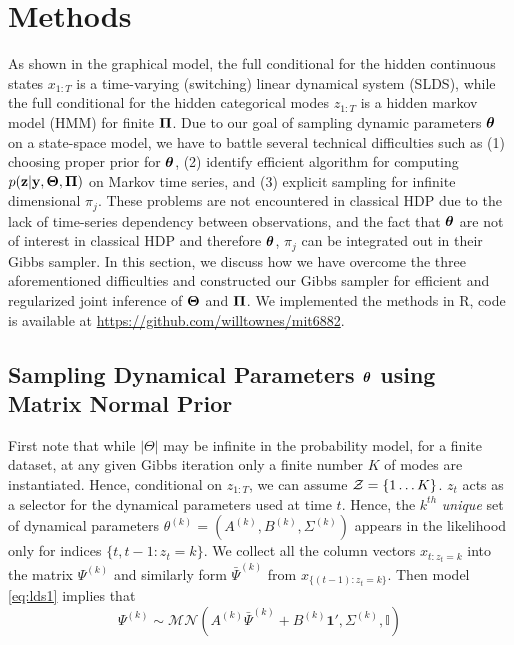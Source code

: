 \documentclass{article} %
\begin{document}
\section{Methods}

As shown in the graphical model, the full conditional for the hidden continuous states $x_{1:T}$ is a time-varying (switching) linear dynamical system (SLDS), while the full conditional for the hidden categorical modes $z_{1:T}$ is a hidden markov model (HMM) for finite $\boldsymbol{\Pi}$. Due to our goal of sampling dynamic parameters $\boldsymbol{\theta}$ on a state-space model, we have to battle several technical difficulties such as (1) choosing proper prior for $\boldsymbol{\theta}$, (2) identify efficient algorithm for computing $p({\bf z}|{\bf y}, \boldsymbol{\Theta}, \boldsymbol{\Pi})$ on Markov time series, and (3) explicit sampling for infinite dimensional $\pi_j$. These problems are not encountered in classical HDP \citep{teh_hierarchical_2006} due to the lack of time-series dependency between observations, and the fact that $\boldsymbol{\theta}$ are not of interest in classical HDP and therefore $\boldsymbol{\theta}$, $\pi_j$ can be integrated out in their Gibbs sampler. In this section, we discuss how we have overcome the three aforementioned difficulties and constructed our Gibbs sampler for efficient and regularized joint inference of $\boldsymbol{\Theta}$ and $\boldsymbol{\Pi}$. We implemented the methods in R, code is available at \url{https://github.com/willtownes/mit6882}.

\subsection{Sampling Dynamical Parameters $\boldsymbol{\theta}$ using Matrix Normal Prior}

First note that while $\vert\Theta\vert$ may be infinite in the probability model, for a finite dataset, at any given Gibbs iteration only a finite number $K$ of modes are instantiated. Hence, conditional on $z_{1:T}$, we can assume ${\cal Z}=\{1\ldots K\}$. $z_t$ acts as a selector for the dynamical parameters used at time $t$. Hence, the $k^{th}$ \textit{unique} set of dynamical parameters $\theta^{(k)} = (A^{(k)},B^{(k)},\Sigma^{(k)})$ appears in the likelihood only for indices $\{t,t-1: z_t=k\}$. We collect all the column vectors $x_{t:z_t=k}$ into the matrix $\Psi^{(k)}$ and similarly form $\bar{\Psi}^{(k)}$ from $x_{\{(t-1):z_t=k\}}$. Then model \eqref{eq:lds1} implies that
\[\Psi^{(k)}\sim\mathcal{MN}(A^{(k)}\bar{\Psi}^{(k)}+B^{(k)}\mathbf{1}',\Sigma^{(k)},\mathbb{I})\]
\end{document}
